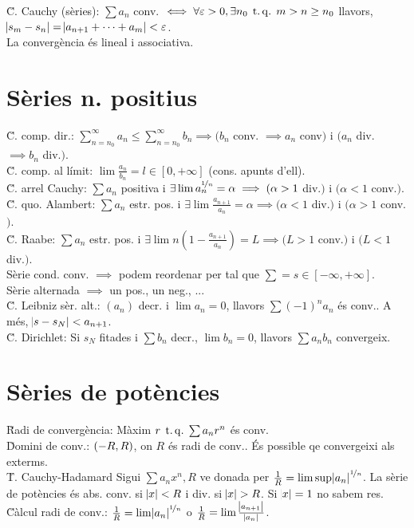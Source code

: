 \u{C. Cauchy (sèries)}: $\sum a_n$ conv. $\iff \forall \varepsilon > 0, \exists n_0 \operatorname{\;t.q.\;} m>n\geq n_0$ llavors, $\abs{s_m-s_n} = \abs{a_{n+1} + \dots + a_m} < \varepsilon$. \\
\ci La convergència és lineal i associativa.

\section{Sèries n. positius}

\u{C. comp. dir.}: $\sum_{n=n_0}^\infty a_n \leq \sum_{n=n_0}^\infty b_n \implies (b_n$ conv. $\implies a_n$ conv$)$ i $(a_n$ div. $\implies b_n$ div.$)$. \\
\u{C. comp. al límit}: $\lim\frac{a_n}{b_n}=l\in[0,+\infty]$ (cons. apunts d'ell).\\
\u{C. arrel Cauchy}: $\sum a_n$ positiva i $\exists \lim a_n^{\nicefrac{1}{n}}=\alpha \implies (\alpha >1$ div.$)$ i $(\alpha < 1$ conv.$)$.\\
\u{C. quo. Alambert}: $\sum a_n$ estr. pos. i $\exists\lim\frac{a_{n+1}}{a_n}=\alpha \implies (\alpha <1$ div.$)$ i $(\alpha > 1$ conv.$)$.\\
\u{C. Raabe}: $\sum a_n$ estr. pos. i $\exists\lim n\left(1-\frac{a_{n+1}}{a_n}\right) = L \implies (L > 1$ conv.$)$ i $(L<1$ div.$)$.\\
\ci Sèrie cond. conv. $\implies$ podem reordenar per tal que $\sum = s\in\left[-\infty, +\infty\right]$.\\
\ci Sèrie alternada $\implies$ un pos., un neg., ... \\
\u{C. Leibniz sèr. alt.}: $(a_n)$ decr. i $\lim a_n = 0$, llavors $\sum (-1)^na_n$ és conv.. A més, $\abs{s-s_N} < a_{n+1}$. \\
\u{C. Dirichlet}: Si $s_N$ fitades i $\sum b_n$ decr., $\lim b_n = 0$, llavors $\sum a_nb_n$ convergeix.

\section{Sèries de potències}

\u{Radi de convergència}: Màxim $r \operatorname{\;t.q.\;} \sum a_nr^n$ és conv. \\
\u{Domini de conv.}: $\left( -R, R\right)$, on $R$ és radi de conv.. És possible qe convergeixi als exterms. \\
\u{T. Cauchy-Hadamard} Sigui $\sum a_nx^n, R$ ve donada per $\frac{1}{R} = \lim \sup \abs{a_n}^{\nicefrac{1}{n}}$. La sèrie de potències és abs. conv. si $\abs{x} < R$ i div. si $\abs{x} > R$. Si $\abs{x} = 1$ no sabem res. \\
\u{Càlcul radi de conv.}: $\frac{1}{R} = \lim \abs{a_n}^{\nicefrac{1}{n}}$ o $\frac{1}{R} = \lim\frac{\abs{a_{n+1}}}{\abs{a_n}}$.

